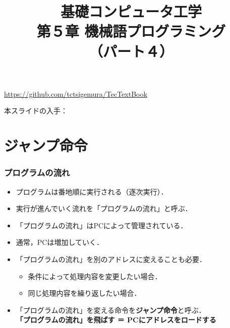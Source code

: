 \documentclass[handout]{beamer}        %
\begin{document}
\title{基礎コンピュータ工学\\第５章 機械語プログラミング\\（パート４）}
\date{}

\begin{frame}
  \titlepage
  \centerline{\url{https://github.com/tctsigemura/TecTextBook}}
  \vfill
  \centerline{本スライドの入手：
    }
\end{frame}


\section{ジャンプ命令}
\begin{frame}
  \frametitle{プログラムの流れ}
  \begin{itemize}
  \item プログラムは番地順に実行される（逐次実行）．
  \item 実行が進んでいく流れを「プログラムの流れ」と呼ぶ．
  \item 「プログラムの流れ」はPCによって管理されている．
  \item 通常，PCは増加していく．
  \item 「プログラムの流れ」を別のアドレスに変えることも必要．
    \begin{itemize}
    \item 条件によって処理内容を変更したい場合．
    \item 同じ処理内容を繰り返したい場合．
    \end{itemize}
  \item 「プログラムの流れ」を変える命令を\textbf{ジャンプ命令}と呼ぶ． \\
    \textbf{「プログラムの流れ」を飛ばす ＝ PCにアドレスをロードする}
  \end{itemize}
  \vfill
  \vfill
\end{frame}
\end{document}
